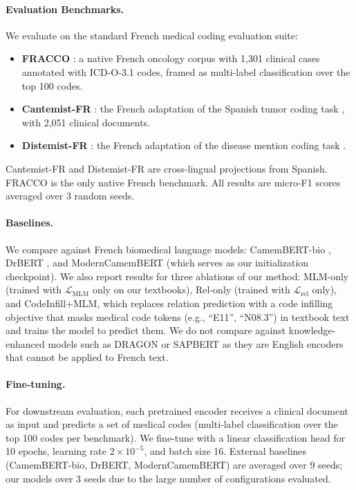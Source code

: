 \paragraph{Evaluation Benchmarks.}
We evaluate on the standard French medical coding evaluation suite:
\begin{itemize}
\item \textbf{FRACCO} \citep{pignat2024fracco}: a native French oncology corpus with 1,301 clinical cases annotated with ICD-O-3.1 codes, framed as multi-label classification over the top 100 codes.
\item \textbf{Cantemist-FR} \citep{zaghir2023frasimed}: the French adaptation of the Spanish tumor coding task \citep{miranda2020cantemist}, with 2,051 clinical documents.
\item \textbf{Distemist-FR} \citep{zaghir2023frasimed}: the French adaptation of the disease mention coding task \citep{miranda2022distemist}.
\end{itemize}
\begin{reviewread}
Cantemist-FR and Distemist-FR are cross-lingual projections from Spanish. FRACCO is the only native French benchmark. All results are micro-F1 scores averaged over 3 random seeds.
\end{reviewread}

\paragraph{Baselines.}
We compare against French biomedical language models: CamemBERT-bio \citep{touchent2023camembertbio}, DrBERT \citep{labrak2023drbert}, and ModernCamemBERT \citep{music2025moderncamembert} (which serves as our initialization checkpoint). We also report results for three ablations of our method: MLM-only (trained with $\mathcal{L}_{\text{MLM}}$ only on our textbooks), Rel-only (trained with $\mathcal{L}_{\text{rel}}$ only), and CodeInfill+MLM, which replaces relation prediction with a code infilling objective that masks medical code tokens (e.g., ``E11'', ``N08.3'') in textbook text and trains the model to predict them. We do not compare against knowledge-enhanced models such as DRAGON \citep{yasunaga2022dragon} or SAPBERT \citep{liu2021sapbert} as they are English encoders that cannot be applied to French text.

\paragraph{Fine-tuning.}
For downstream evaluation, each pretrained encoder receives a clinical document as input and predicts a set of medical codes (multi-label classification over the top 100 codes per benchmark). We fine-tune with a linear classification head for 10 epochs, learning rate $2 \times 10^{-5}$, and batch size 16. External baselines (CamemBERT-bio, DrBERT, ModernCamemBERT) are averaged over 9 seeds; our models over 3 seeds due to the large number of configurations evaluated.

